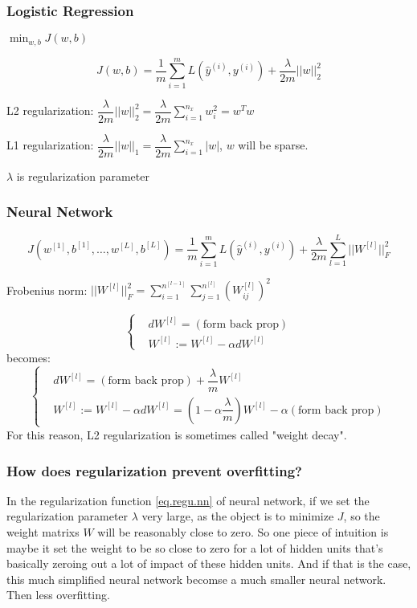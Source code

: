 \subsubsection{Logistic Regression}
$\min_{w, b} J(w, b)$

$$J(w, b) = \dfrac{1}{m} \sum_{i = 1}^m L(\hat{y}^{(i)}, y^{(i)}) + \dfrac{\lambda}{2m} ||w||_2^2$$

L2 regularization: $\dfrac{\lambda}{2m} ||w||_2^2 = \dfrac{\lambda}{2m} \sum_{i = 1}^{n_x} w_i^2 = w^T w$

L1 regularization: $\dfrac{\lambda}{2m} ||w||_1 = \dfrac{\lambda}{2m} \sum_{i = 1}^{n_x} |w|$, $w$ will be sparse.

$\lambda$ is regularization parameter

\subsubsection{Neural Network}
\begin{equation}
J(w^{[1]}, b^{[1]}, \ldots, w^{[L]}, b^{[L]}) = \dfrac{1}{m} \sum_{i = 1}^m L(\hat{y}^{(i)}, y^{(i)}) + \dfrac{\lambda}{2m} \sum_{l = 1}^L ||W^{[l]}||_F^2
\label{eq.regu.nn}
\end{equation}

Frobenius norm: $||W^{[l]}||_F^2 = \sum_{i = 1}^{n^{[l - 1]}} \sum_{j = 1}^{n^{[l]}} (W_{ij}^{[l]})^2$

$$
\left\{
\begin{aligned}
& dW^{[l]} = (\text{form back prop}) \\
& W^{[l]} := W^{[l]} - \alpha dW^{[l]}
\end{aligned}
\right.
$$
becomes:
$$
\left\{
\begin{aligned}
& dW^{[l]} = (\text{form back prop}) + \dfrac{\lambda}{m} W^{[l]} \\
& W^{[l]} := W^{[l]} - \alpha dW^{[l]} = (1 - \alpha \dfrac{\lambda}{m}) W^{[l]} - \alpha (\text{form back prop})
\end{aligned}
\right.
$$
For this reason, L2 regularization is sometimes called "weight decay".

\subsubsection{How does regularization prevent overfitting?}
In the regularization function \eqref{eq.regu.nn} of neural network, if we set the regularization parameter $\lambda$ very large, as the object is to minimize $J$, so the weight matrixs $W$ will be reasonably close to zero.
So one piece of intuition is maybe it set the weight to be so close to zero for a lot of hidden units that's basically zeroing out a lot of impact of these hidden units.
And if that is the case, this much simplified neural network becomse a much smaller neural network. Then less overfitting.

